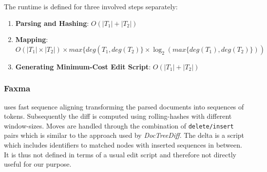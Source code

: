 

The runtime is defined for three involved steps separately: 

\begin{enumerate}
\item {\bf{Parsing and Hashing}}: $O(|T_{1}| + |T_{2}|)$
\item {\bf{Mapping}}: $O(|T_{1}| \times |T_{2}|) \times max\{deg(T_{1}, deg(T_{2})\} \times \log_{2}(max\{deg(T_{1}), deg(T_{2})\}))$
\item {\bf{Generating Minimum-Cost Edit Script}}: $O(|T_{1}| + |T_{2}|)$
\end{enumerate}

\subsubsection{Faxma\cite{lindholm2006fast}}
uses fast sequence aligning transforming the parsed documents into sequences of tokens. Subsequently the diff is computed using rolling-hashes with different window-sizes. Moves are handled through the combination of \texttt{delete/insert} pairs which is similar to the approach used by \emph{DocTreeDiff}. The delta is a script which includes identifiers to matched nodes with inserted sequences in between. It is thus not defined in terms of a usual edit script and therefore not directly useful for our purpose.   %



